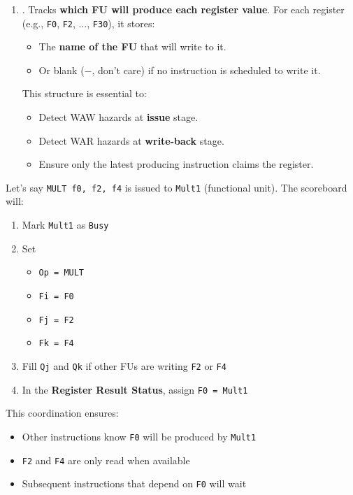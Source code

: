 \begin{enumerate}
    \item {}. Tracks \textbf{which FU will produce each register value}. For each register (e.g., \texttt{F0}, \texttt{F2}, $\dots$, \texttt{F30}), it stores:
    \begin{itemize}
        \item The \textbf{name of the FU} that will write to it.
        \item Or blank ($-$, don't care) if no instruction is scheduled to write it.
    \end{itemize}
    This structure is essential to:
    \begin{itemize}
        \item Detect WAW hazards at \textbf{issue} stage.
        \item Detect WAR hazards at \textbf{write-back} stage.
        \item Ensure only the latest producing instruction claims the register.
    \end{itemize}
\end{enumerate}

\begin{examplebox}
    Let's say \texttt{MULT f0, f2, f4} is issued to \texttt{Mult1} (functional unit). The scoreboard will:
    \begin{enumerate}
        \item Mark \texttt{Mult1} as \texttt{Busy}
        \item Set
        \begin{itemize}
            \item \texttt{Op = MULT}
            \item \texttt{Fi = F0}
            \item \texttt{Fj = F2}
            \item \texttt{Fk = F4}
        \end{itemize}
        \item Fill \texttt{Qj} and \texttt{Qk} if other FUs are writing \texttt{F2} or \texttt{F4}
        \item In the \textbf{Register Result Status}, assign \texttt{F0 = Mult1}
    \end{enumerate}
    This coordination ensures:
    \begin{itemize}
        \item Other instructions know \texttt{F0} will be produced by \texttt{Mult1}
        \item \texttt{F2} and \texttt{F4} are only read when available
        \item Subsequent instructions that depend on \texttt{F0} will wait
    \end{itemize}
\end{examplebox}